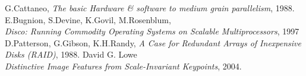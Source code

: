 \begin{thebibliography}{9}
  G.Cattaneo, \textit{The basic Hardware \& software to medium grain parallelism}, 1988.
  E.Bugnion, S.Devine, K.Govil, M.Rosenblum, \\ \textit{Disco: Running Commodity Operating Systems on Scalable Multiprocessors}, 1997
  D.Patterson, G.Gibson, K.H.Randy, \textit{A Case for Redundant Arrays of Inexpensive Disks (RAID)}, 1988.
  David G. Lowe  \\ \textit{Distinctive Image Features from Scale-Invariant Keypoints}, 2004.
\end{thebibliography}
